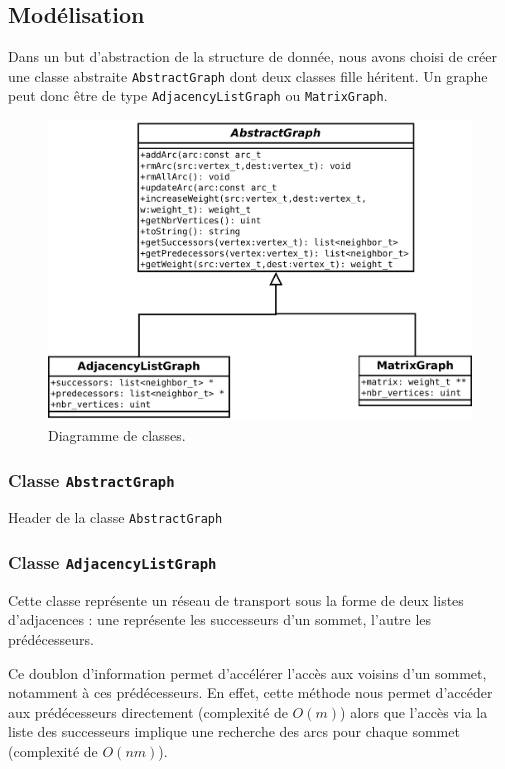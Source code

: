 \subsection{Modélisation}
Dans un but d'abstraction de la structure de donnée, nous avons choisi de créer une classe abstraite \texttt{AbstractGraph} dont deux classes fille héritent. Un graphe peut donc être de type \texttt{AdjacencyListGraph} ou \texttt{MatrixGraph}.
\begin{figure}[t]
\begin{center}
\includegraphics[width=\textwidth]{files/diag_class}
\end{center}
\caption{Diagramme de classes.}
\end{figure}

\FloatBarrier

\subsubsection{Classe \texttt{AbstractGraph}}

Header de la classe \texttt{AbstractGraph}



\subsubsection{Classe \texttt{AdjacencyListGraph}}
Cette classe représente un réseau de transport sous la forme
de deux listes d'adjacences : une représente les 
successeurs d'un sommet, l'autre les prédécesseurs.

Ce doublon d'information permet d'accélérer l'accès aux voisins d'un sommet, notamment à ces prédécesseurs. En effet, cette méthode nous permet d'accéder aux prédécesseurs directement (complexité de $O(m)$) alors que l'accès via la liste des successeurs implique une recherche des arcs pour chaque sommet (complexité de $O(nm)$).

